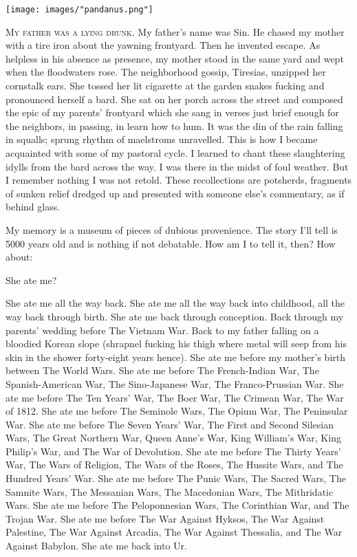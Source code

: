 \documentclass[
]{memoir}
\begin{document}
\begin{center}\texttt{[image: images/"pandanus.png"]}\end{center}

\lettrine[lines=3, findent=0em, nindent=0.1em, lhang=0]{M}{y father was a lying drunk}.
My father's name was Sin. He chased my mother with a tire iron about the
yawning frontyard. Then he invented escape. As helpless in his absence
as presence, my mother stood in the same yard and wept when the
floodwaters rose. The neighborhood gossip, Tiresias, unzipped her
cornstalk ears. She tossed her lit cigarette at the garden snakes
fucking and pronounced herself a bard. She sat on her porch across the
street and composed the epic of my parents' frontyard which she sang in
verses just brief enough for the neighbors, in passing, in learn how to
hum. It was the din of the rain falling in squalls; sprung rhythm of
maelstroms unravelled. This is how I became acquainted with some of my
pastoral cycle. I learned to chant these slaughtering idylls from the
bard across the way. I was there in the midst of foul weather. But I
remember nothing I was not retold. These recollections are potsherds,
fragments of sunken relief dredged up and presented with someone else's
commentary, as if behind glass.

My memory is a museum of pieces of dubious provenience. The story I'll
tell is 5000 years old and is nothing if not debatable. How am I to tell
it, then? How about:

She ate me?

She ate me all the way back. She ate me all the way back into childhood,
all the way back through birth. She ate me back through conception. Back
through my parents' wedding before The Vietnam War. Back to my father
falling on a bloodied Korean slope (shrapnel fucking his thigh where
metal will seep from his skin in the shower forty-eight years hence).
She ate me before my mother's birth between The World Wars. She ate me
before The French-Indian War, The Spanish-American War, The
Sino-Japanese War, The Franco-Prussian War. She ate me before The Ten
Years' War, The Boer War, The Crimean War, The War of 1812. She ate me
before The Seminole Wars, The Opium War, The Peninsular War. She ate me
before The Seven Years' War, The First and Second Silesian Wars, The
Great Northern War, Queen Anne's War, King William's War, King Philip's
War, and The War of Devolution. She ate me before The Thirty Years' War,
The Wars of Religion, The Wars of the Roses, The Hussite Wars, and The
Hundred Years' War. She ate me before The Punic Wars, The Sacred Wars,
The Samnite Wars, The Messanian Wars, The Macedonian Wars, The
Mithridatic Wars. She ate me before The Peloponnesian Wars, The
Corinthian War, and The Trojan War. She ate me before The War Against
Hyksos, The War Against Palestine, The War Against Arcadia, The War
Against Thessalia, and The War Against Babylon. She ate me back into Ur.
\end{document}
